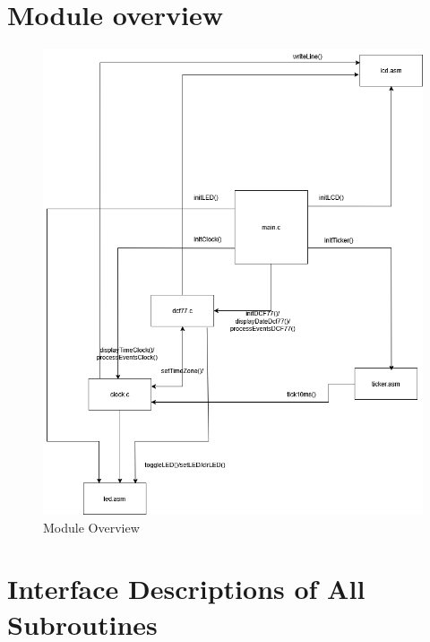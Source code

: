 \documentclass[a4paper,12pt]{article}
\begin{document}
\newpage


\section{Module overview}

\begin{figure}[H]
    \centering
    \includegraphics[width=1\textwidth]{diagrams/1.ModuleOverview.png}
    \caption{Module Overview}
    \label{fig:ModuleOverview}
\end{figure}

\newpage


\section{Interface Descriptions of All Subroutines}
\end{document}
